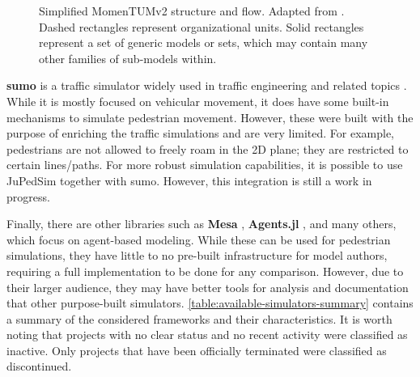 \documentclass[twoside, 11pt]{article}
\begin{document}
\begin{figure}[h]
  \centering
  
  \caption[Simplified MomenTUMv2 structure and flow]{Simplified MomenTUMv2 structure and flow. Adapted from \cite{kielarMomenTUMv2ModularExtensible2016}. Dashed rectangles represent organizational units. Solid rectangles represent a set of generic models or sets, which may contain many other families of sub-models within.}
  \label{fig:momentun_architecture}
\end{figure}

\textbf{\gls{sumo}} is a traffic simulator widely used in traffic engineering and related topics \cite{SUMO2018}. While it is mostly focused on vehicular movement, it does have some built-in mechanisms to simulate pedestrian movement. However, these were built with the purpose of enriching the traffic simulations and are very limited. For example, pedestrians are not allowed to freely roam in the 2D plane; they are restricted to certain lines/paths. For more robust simulation capabilities, it is possible to use JuPedSim together with \gls{sumo}. However, this integration is still a work in progress.

Finally, there are other libraries such as \textbf{Mesa} \cite{hoevenMesa3Agentbased2025}, \textbf{Agents.jl} \cite{Agents.jl}, and many others, which focus on agent-based modeling. While these can be used for pedestrian simulations, they have little to no pre-built infrastructure for model authors, requiring a full implementation to be done for any comparison. However, due to their larger audience, they may have better tools for analysis and documentation that other purpose-built simulators. \autoref{table:available-simulators-summary} contains a summary of the considered frameworks and their characteristics. It is worth noting that projects with no clear status and no recent activity were classified as inactive. Only projects that have been officially terminated were classified as discontinued.
\end{document}
